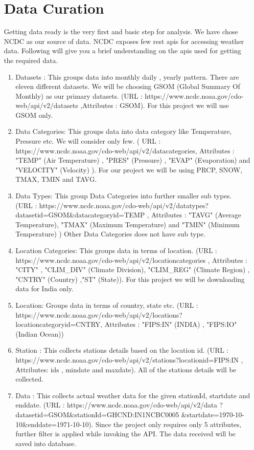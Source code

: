 \documentclass[9pt,twocolumn,twoside]{../../styles/osajnl}
\begin{document}
\section{Data Curation}
Getting data ready is the very first and basic step for analysis. We have chose NCDC \cite{www-ncdc} as our source of data. NCDC \cite{www-ncdc} exposes few rest apis for accessing weather data. Following will give you a brief understanding on the apis used for getting the required data.

\begin{enumerate}

\item Datasets : This groups data into monthly daily , yearly pattern. There are eleven different datasets. We will be choosing GSOM (Global Summary Of Monthly) as our primary datasets. (URL : https://www.ncdc.noaa.gov/cdo-web/api/v2/datasets ,Attributes : GSOM). For this project we will use GSOM only.  
\item Data Categories: This groups data into data category like Temperature, Pressure etc. We will consider only few. ( URL : https://www.ncdc.noaa.gov/cdo-web/api/v2/datacategories, Attributes : "TEMP" (Air Temperature) , "PRES" (Pressure) , "EVAP" (Evaporation) and "VELOCITY" (Velocity) ). For our project we will be using PRCP, SNOW, TMAX, TMIN and TAVG.
\item Data Types: This group Data Categories into further smaller sub types. (URL : https://www.ncdc.noaa.gov/cdo-web/api/v2/datatypes?datasetid=GSOM\&datacategoryid=TEMP , Attributes : "TAVG" (Average Temperature), "TMAX" (Maximum Temperature) and "TMIN" (Minimum Temperature)    ) Other Data Categories does not have sub type.
\item Location Categories: This groups data in terms of location. (URL : https://www.ncdc.noaa.gov/cdo-web/api/v2/locationcategories , Attributes : "CITY" , "CLIM\_DIV" (Climate Division), "CLIM\_REG" (Climate Region) , "CNTRY" (Country) ,"ST" (State)). For this project we will be downloading data for India only.
\item  Location: Groups data in terms of country, state etc. (URL : https://www.ncdc.noaa.gov/cdo-web/api/v2/locations?locationcategoryid=CNTRY, Attributes : "FIPS:IN" (INDIA) , "FIPS:IO" (Indian Ocean))  
\item Station : This collects stations details based on the location id. (URL : https://www.ncdc.noaa.gov/cdo-web/api/v2/stations?locationid=FIPS:IN , Attributes: ids , mindate and maxdate). All of the stations details will be collected.   
\item Data : This collects actual weather data for the given stationId,
 startdate and enddate. (URL : https://www.ncdc.noaa.gov/cdo-web/api/v2/data 
 ?datasetid=GSOM\&stationId=GHCND:IN1NCBC0005
 \&startdate=1970-10-10\&enddate=1971-10-10).
 Since the project only requires only 5 attributes, 
 further filter is applied while invoking the API. The data received will be saved into database. 
\end{enumerate}
\end{document}
